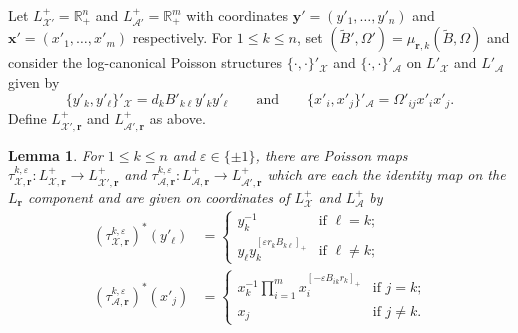 \documentclass{amsart}
\newtheorem{lemma}[theorem]{Lemma}
\numberwithin{equation}{section}
\newcommand{\bfr}{{\boldsymbol{r}}}
\newcommand{\bfx}{{\boldsymbol{x}}}
\newcommand{\bfy}{{\boldsymbol{y}}}
\newcommand{\cA}{\mathcal{A}}
\newcommand{\cX}{\mathcal{X}}
\newcommand{\RR}{\mathbb{R}}
\begin{document}
Let $L^+_{\cX'}=\RR_+^n$ and $L^+_{\cA'}=\RR_+^m$ with coordinates $\bfy'=(y'_1,\ldots,y'_n)$ and $\bfx'=(x'_1,\ldots,x'_m)$ respectively.
For $1\le k\le n$, set $(\tilde B',\Omega')=\mu_{\bfr,k}(\tilde B,\Omega)$ and consider the log-canonical Poisson structures $\{\cdot,\cdot\}'_\cX$ and $\{\cdot,\cdot\}'_\cA$ on $L'_\cX$ and $L'_\cA$ given by
\begin{equation}
  \label{eq:brackets2}
  \{y'_k,y'_\ell\}'_\cX=d_kB'_{k\ell}y'_ky'_\ell\qquad\text{and}\qquad\{x'_i,x'_j\}'_\cA=\Omega'_{ij}x'_ix'_j.
\end{equation}
Define $L^+_{\cX',\bfr}$ and $L^+_{\cA',\bfr}$ as above.
\begin{lemma}
  \label{le:tropical cluster transformations}
  For $1\le k\le n$ and $\varepsilon\in\{\pm1\}$, there are Poisson maps $\tau_{\cX,\bfr}^{k,\varepsilon}:L^+_{\cX,\bfr}\to L^+_{\cX',\bfr}$ and $\tau_{\cA,\bfr}^{k,\varepsilon}:L^+_{\cA,\bfr}\to L^+_{\cA',\bfr}$ which are each the identity map on the $L_\bfr$ component and are given on coordinates of $L^+_\cX$ and $L^+_\cA$ by
  \begin{align}
    \label{eq:tropical X transformation}
    (\tau_{\cX,\bfr}^{k,\varepsilon})^*(y'_\ell)
    &=\begin{cases} 
      y_k^{-1} & \text{if $\ell=k$;}\\ 
      y_\ell y_k^{[\varepsilon r_kB_{k\ell}]_+} & \text{if $\ell\ne k$;}
    \end{cases}\\
    \label{eq:tropical A transformation}
    (\tau_{\cA,\bfr}^{k,\varepsilon})^*(x'_j)
    &=\begin{cases} 
      x_k^{-1}\prod\limits_{i=1}^m x_i^{[-\varepsilon B_{ik}r_k]_+} & \text{if $j=k$;}\\
      x_j & \text{if $j\ne k$.}
    \end{cases}
  \end{align}
\end{lemma}
\end{document}
